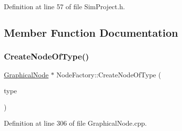 Definition at line 57 of file Sim\+Project.\+h.



\subsection{Member Function Documentation}
\mbox{\label{class_node_factory_ae55ad09e7b24522328a979fce9ac5e2a}} 
\subsubsection{\texorpdfstring{Create\+Node\+Of\+Type()}{CreateNodeOfType()}\hspace{0.1cm}{\footnotesize\ttfamily [1/2]}}
{\footnotesize\ttfamily \hyperlink{class_graphical_node}{Graphical\+Node} $\ast$ Node\+Factory\+::\+Create\+Node\+Of\+Type (\begin{DoxyParamCaption}\item[{\hyperlink{class_generic_node_a9e7985ab9bbfa1c85091adc0ab71a6b6}{Generic\+Node\+::\+Type}}]{type }\end{DoxyParamCaption})\hspace{0.3cm}{\ttfamily [static]}}



Definition at line 306 of file Graphical\+Node.\+cpp.

